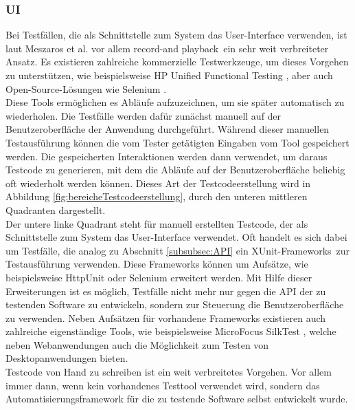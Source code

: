 \subsubsection{UI}
\label{subsubsec:UI}
Bei Testfällen, die als Schnittstelle zum System das User-Interface verwenden, ist laut  Meszaros et al. \cite{meszaros_agile_2003} vor allem \grq record-and playback\grq\ ein sehr weit verbreiteter Ansatz. Es existieren zahlreiche kommerzielle Testwerkzeuge, um dieses Vorgehen zu unterstützen, wie beispielsweise HP Unified Functional Testing \cite{hp_testautomatisierung_2015}, aber auch Open-Source-Lösungen wie Selenium \cite{selenium_selenium_2015}.\\
Diese Tools ermöglichen es Abläufe aufzuzeichnen, um sie später automatisch zu wiederholen. Die Testfälle werden dafür zunächst manuell auf der Benutzeroberfläche der Anwendung durchgeführt. Während dieser manuellen Testausführung können die vom Tester getätigten Eingaben vom Tool gespeichert werden. Die gespeicherten Interaktionen werden dann verwendet, um daraus Testcode zu generieren, mit dem die Abläufe auf der Benutzeroberfläche beliebig oft wiederholt werden können. Dieses Art der Testcodeerstellung wird in Abbildung \ref{fig:bereicheTestcodeerstellung}, durch den unteren mittleren Quadranten dargestellt.\\
Der untere linke Quadrant steht für manuell erstellten Testcode, der als Schnittstelle zum System das User-Interface verwendet. Oft handelt es sich dabei um Testfälle, die analog zu Abschnitt \ref{subsubsec:API} ein \grq XUnit-Frameworks\grq\ zur Testausführung verwenden. Diese Frameworks können um Aufsätze, wie beispielsweise HttpUnit \cite{httpunit_httpunit_2015} oder Selenium \cite{selenium_selenium_2015} erweitert werden. Mit Hilfe dieser Erweiterungen ist es möglich, Testfälle nicht mehr nur gegen die API der zu testenden Software zu entwickeln, sondern zur Steuerung die Benutzeroberfläche zu verwenden. Neben Aufsätzen für vorhandene Frameworks existieren auch zahlreiche eigenständige Tools, wie beispielsweise MicroFocus SilkTest \cite{silk_test_borland_2015}, welche neben Webanwendungen auch die Möglichkeit zum Testen von Desktopanwendungen bieten.\\
Testcode von Hand zu schreiben ist ein weit verbreitetes Vorgehen. Vor allem immer dann, wenn kein vorhandenes Testtool verwendet wird, sondern das Automatisierungsframework für die zu testende Software selbst entwickelt wurde.


